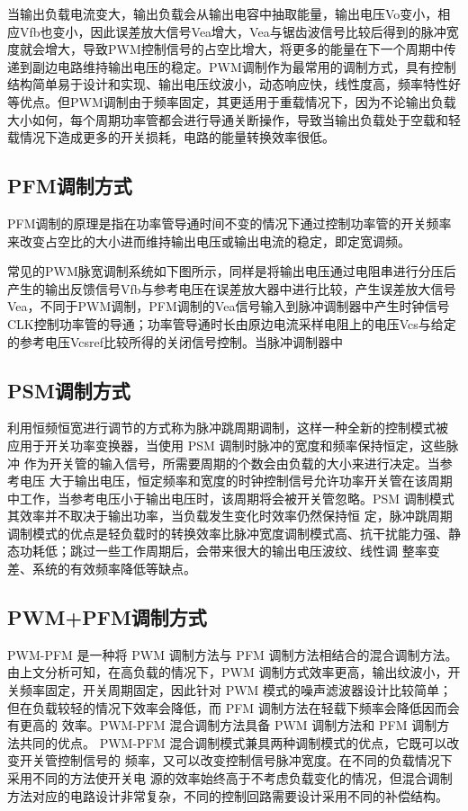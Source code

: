 当输出负载电流变大，输出负载会从输出电容中抽取能量，输出电压Vo变小，相应Vfb也变小，因此误差放大信号Vea增大，Vea与锯齿波信号比较后得到的脉冲宽度就会增大，导致PWM控制信号的占空比增大，将更多的能量在下一个周期中传递到副边电路维持输出电压的稳定。PWM调制作为最常用的调制方式，具有控制结构简单易于设计和实现、输出电压纹波小，动态响应快，线性度高，频率特性好等优点。但PWM调制由于频率固定，其更适用于重载情况下，因为不论输出负载大小如何，每个周期功率管都会进行导通关断操作，导致当输出负载处于空载和轻载情况下造成更多的开关损耗，电路的能量转换效率很低。

\subsection{PFM调制方式}
PFM调制的原理是指在功率管导通时间不变的情况下通过控制功率管的开关频率来改变占空比的大小进而维持输出电压或输出电流的稳定，即定宽调频。

常见的PWM脉宽调制系统如下图所示，同样是将输出电压通过电阻串进行分压后产生的输出反馈信号Vfb与参考电压在误差放大器中进行比较，产生误差放大信号Vea，不同于PWM调制，PFM调制的Vea信号输入到脉冲调制器中产生时钟信号CLK控制功率管的导通；功率管导通时长由原边电流采样电阻上的电压Vcs与给定的参考电压Vcsref比较所得的关闭信号控制。当脉冲调制器中
\subsection{PSM调制方式}
利用恒频恒宽进行调节的方式称为脉冲跳周期调制，这样一种全新的控制模式被 应用于开关功率变换器，当使用 PSM 调制时脉冲的宽度和频率保持恒定，这些脉冲 作为开关管的输入信号，所需要周期的个数会由负载的大小来进行决定。当参考电压 大于输出电压，恒定频率和宽度的时钟控制信号允许功率开关管在该周期中工作，当参考电压小于输出电压时，该周期将会被开关管忽略。PSM 调制模式其效率并不取决于输出功率，当负载发生变化时效率仍然保持恒 定，脉冲跳周期调制模式的优点是轻负载时的转换效率比脉冲宽度调制模式高、抗干扰能力强、静态功耗低；跳过一些工作周期后，会带来很大的输出电压波纹、线性调 整率变差、系统的有效频率降低等缺点。
\subsection{PWM+PFM调制方式}
PWM-PFM 是一种将 PWM 调制方法与 PFM 调制方法相结合的混合调制方法。 由上文分析可知，在高负载的情况下，PWM 调制方式效率更高，输出纹波小，开关频率固定，开关周期固定，因此针对 PWM 模式的噪声滤波器设计比较简单；但在负载较轻的情况下效率会降低，而 PFM 调制方法在轻载下频率会降低因而会有更高的 效率。PWM-PFM 混合调制方法具备 PWM 调制方法和 PFM 调制方法共同的优点。 PWM-PFM 混合调制模式兼具两种调制模式的优点，它既可以改变开关管控制信号的 频率，又可以改变控制信号脉冲宽度。在不同的负载情况下采用不同的方法使开关电 源的效率始终高于不考虑负载变化的情况，但混合调制方法对应的电路设计非常复杂，不同的控制回路需要设计采用不同的补偿结构。

